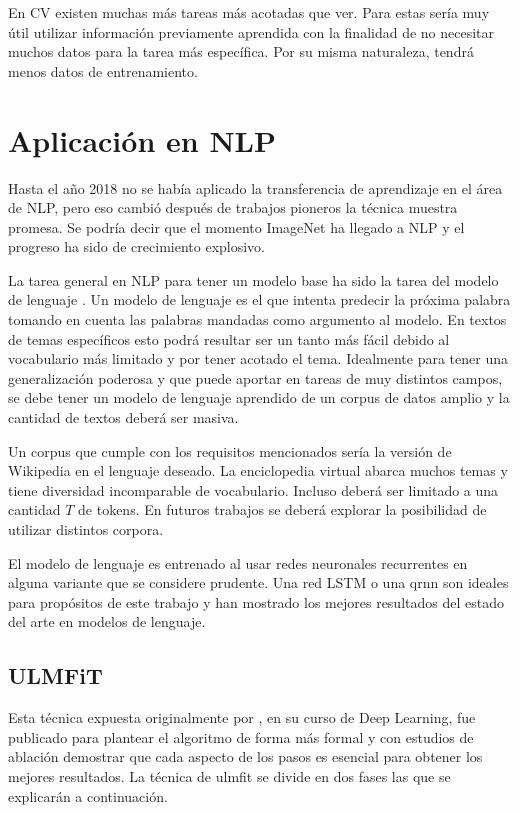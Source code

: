 En CV existen muchas más tareas más acotadas que ver. Para estas sería muy útil utilizar información previamente aprendida con la finalidad de no necesitar muchos datos para la tarea más específica. Por su misma naturaleza, tendrá menos datos de entrenamiento.

\section{Aplicación en NLP}

Hasta el año 2018 no se había aplicado la transferencia de aprendizaje en el área de NLP, pero eso cambió después de trabajos pioneros \parencite{peters:2018, howard2018, devlin2018bert} la técnica muestra promesa. Se podría decir que el momento ImageNet ha llegado a NLP y el progreso ha sido de crecimiento explosivo.

La tarea general en NLP para tener un modelo base ha sido la tarea del modelo de lenguaje \parencite{howard2018}. Un modelo de lenguaje es el que intenta predecir la próxima palabra tomando en cuenta las palabras mandadas como argumento al modelo. En textos de temas específicos esto podrá resultar ser un tanto más fácil debido al vocabulario más limitado y por tener acotado el tema. Idealmente para tener una generalización poderosa y que puede aportar en tareas de muy distintos campos, se debe tener un modelo de lenguaje aprendido de un corpus de datos amplio y la cantidad de textos deberá ser masiva.

Un corpus que cumple con los requisitos mencionados sería la versión de Wikipedia en el lenguaje deseado. La enciclopedia virtual abarca muchos temas y tiene diversidad incomparable de vocabulario. Incluso deberá ser limitado a una cantidad $T$ de tokens. En futuros trabajos se deberá explorar la posibilidad de utilizar distintos corpora.

El modelo de lenguaje es entrenado al usar redes neuronales recurrentes en alguna variante que se considere prudente. Una red LSTM o una \gls{qrnn} \parencite{bradbury2016} son ideales para propósitos de este trabajo y han mostrado los mejores resultados del estado del arte en modelos de lenguaje.

\subsection{ULMFiT}

Esta técnica expuesta originalmente por \textcite{howard2018}, en su curso de Deep Learning, fue publicado para plantear el algoritmo de forma más formal y con estudios de ablación demostrar que cada aspecto de los pasos es esencial para obtener los mejores resultados. La técnica de \gls{ulmfit} se divide en dos fases \parencite{howard2018} las que se explicarán a continuación.

